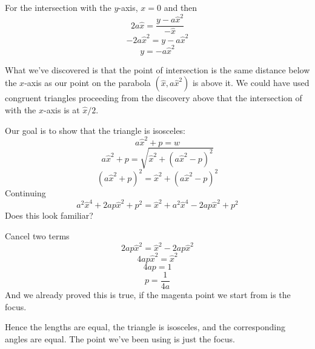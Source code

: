 \documentclass[11pt, oneside]{article}
\begin{document}
For the intersection with the $y$-axis, $x = 0$ and then
\[ 2a \hat{x} = \frac{y - a \hat{x}^2}{- \hat{x}} \]
\[ -2a \hat{x}^2 = y - a \hat{x}^2 \]
\[ y = - a \hat{x}^2 \]

What we've discovered is that the point of intersection is the same distance below the $x$-axis as our point on the parabola $(\hat{x}, a\hat{x}^2)$ is above it.  We could have used congruent triangles proceeding from the discovery above that the intersection of with the $x$-axis is at $\hat{x}/2$.

Our goal is to show that the triangle is isosceles:
\[ a\hat{x}^2 + p = w \]
\[ a\hat{x}^2 + p = \sqrt{\hat{x}^2 + (a\hat{x}^2 - p)^2} \]
\[ (a\hat{x}^2 + p)^2 = \hat{x}^2 + (a\hat{x}^2 - p)^2 \]
Continuing
\[ a^2 \hat{x}^4 + 2ap \hat{x}^2 + p^2 = \hat{x}^2 + a^2 \hat{x}^4 - 2ap \hat{x}^2 + p^2 \]
Does this look familiar?

Cancel two terms
\[ 2ap \hat{x}^2 = \hat{x}^2  - 2ap \hat{x}^2 \]
\[ 4ap\hat{x}^2 = \hat{x}^2 \]
\[ 4ap = 1 \]
\[ p = \frac{1}{4a} \]
And we already proved this is true, if the magenta point we start from is the focus.

Hence the lengths are equal, the triangle is isosceles, and the corresponding angles are equal.  The point we've been using is just the focus.
\end{document}
